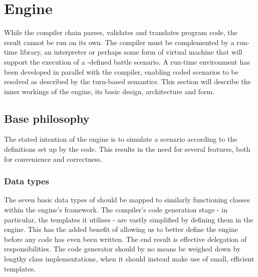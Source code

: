 \section{Engine}
While the \langname{} compiler chain parses, validates and translates program code, the result cannot be run on its own. The compiler must be complemented by a run-time library, an interpreter or perhaps some form of virtual machine that will support the execution of a \langname{}-defined battle scenario. A run-time environment has been developed in parallel with the compiler, enabling coded scenarios to be resolved as described by the turn-based semantics. This section will describe the inner workings of the engine, its basic design, architecture and form.
\begin{comment}
\begin{figure}
\texttt{[image: img/engine\_class\_design]}
\caption{The abstract class design of the engine.}
\end{figure}
\end{comment}

\subsection{Base philosophy}
The stated intention of the engine is to simulate a scenario according to the definitions set up by the \langname{} code. This results in the need for several features, both for convenience and correctness.

\subsubsection{Data types}
The seven basic data types of \langname{} should be mapped to similarly functioning classes within the engine's framework. The compiler's code generation stage - in particular, the templates it utilises - are vastly simplified by defining them in the engine. This has the added benefit of allowing us to better define the engine before any \langname{} code has even been written. The end result is effective delegation of responsibilities. The code generator should by no means be weighed down by lengthy class implementations, when it should instead make use of small, efficient templates.